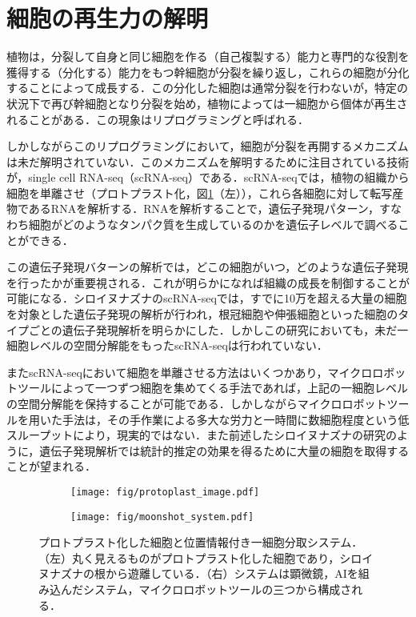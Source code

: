 \thispagestyle{fancy2}

\section{細胞の再生力の解明}
\label{sec:regeneration}

植物は，分裂して自身と同じ細胞を作る（自己複製する）能力と専門的な役割を獲得する（分化する）能力をもつ幹細胞が分裂を繰り返し，これらの細胞が分化することによって成長する\cite{sakamoto2022transcriptional}．この分化した細胞は通常分裂を行わないが，特定の状況下で再び幹細胞となり分裂を始め，植物によっては一細胞から個体が再生されることがある．この現象はリプログラミングと呼ばれる．

しかしながらこのリプログラミングにおいて，細胞が分裂を再開するメカニズムは未だ解明されていない．このメカニズムを解明するために注目されている技術が，single cell RNA-seq（scRNA-seq）\cite{kolodziejczyk2015technology}である．scRNA-seqでは，植物の組織から細胞を単離させ（プロトプラスト化\cite{pasternak2020single}，図\ref{fig:protoplast_and_main_system}（左）），これら各細胞に対して転写産物であるRNAを解析する．RNAを解析することで，遺伝子発現パターン，すなわち細胞がどのようなタンパク質を生成しているのかを遺伝子レベルで調べることができる\cite{xiao2012transcriptome,sakamoto2022transcriptional}．

この遺伝子発現バターンの解析では，どこの細胞がいつ，どのような遺伝子発現を行ったかが重要視される．これが明らかになれば組織の成長を制御することが可能になる．シロイヌナズナのscRNA-seq\cite{shahan2022single}では，すでに10万を超える大量の細胞を対象とした遺伝子発現の解析が行われ，根冠細胞や伸張細胞といった細胞のタイプごとの遺伝子発現解析を明らかにした．しかしこの研究においても，未だ一細胞レベルの空間分解能をもったscRNA-seqは行われていない．

またscRNA-seqにおいて細胞を単離させる方法はいくつかあり\cite{kolodziejczyk2015technology}，マイクロロボットツールによって一つずつ細胞を集めてくる手法であれば，上記の一細胞レベルの空間分解能を保持することが可能である．しかしながらマイクロロボットツールを用いた手法は，その手作業による多大な労力と一時間に数細胞程度という低スループットにより，現実的ではない．また前述したシロイヌナズナの研究のように，遺伝子発現解析では統計的推定の効果を得るために大量の細胞を取得することが望まれる．

\begin{figure}[t]
    \centering
    \begin{subfigure}[t]{0.27\linewidth}
        \centering
        \texttt{[image: fig/protoplast\_image.pdf]}
    \end{subfigure}
    \hfill
    \begin{subfigure}[t]{0.67\linewidth}
        \centering
        \texttt{[image: fig/moonshot\_system.pdf]}
    \end{subfigure}
    \caption[プロトプラスト化した細胞と位置情報付き一細胞分取システム]{プロトプラスト化した細胞と位置情報付き一細胞分取システム．（左）丸く見えるものがプロトプラスト化した細胞であり，シロイヌナズナの根から遊離している．（右）システムは顕微鏡，AIを組み込んだシステム，マイクロロボットツールの三つから構成される．}
    \label{fig:protoplast_and_main_system}
\end{figure}

